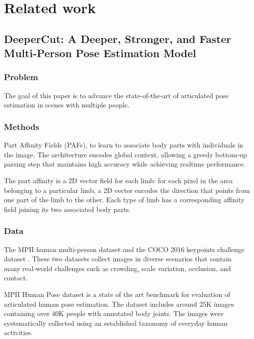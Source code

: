 \chapter{Related work}

\section{DeeperCut\mbox{:} A Deeper, Stronger, and Faster Multi-Person Pose Estimation Model \cite{DBLP:journals/corr/InsafutdinovPAA16}}

\subsection{Problem}
The goal of this paper is to advance the state-of-the-art of articulated pose estimation in scenes with multiple people.

\subsection{Methods}
\par Part Affinity Fields (PAFs), to learn to associate body parts with individuals in the image. The architecture encodes global context, allowing a greedy bottom-up parsing step that maintains high accuracy while achieving realtime performance.	
\par The part affinity is a 2D vector field for each limb: for each pixel in the area belonging to a particular limb, a 2D vector encodes the direction that points from one part of the limb to the other. Each type of limb has a corresponding affinity field joining its two associated body parts.


\subsection{Data}
\par The MPII human multi-person dataset \cite{database2dhuman}  and the COCO 2016 keypoints challenge dataset \cite{coco2016}. These two datasets collect images in diverse scenarios that contain many real-world challenges such as crowding, scale variation, occlusion, and contact.
\par MPII Human Pose dataset is a state of the art benchmark for evaluation of articulated human pose estimation. The dataset includes around 25K images containing over 40K people with annotated body joints. The images were systematically collected using an established taxonomy of everyday human activities.


